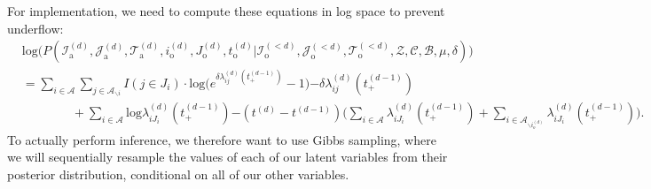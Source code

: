 \documentclass[a4paper]{article}
\begin{document}
For implementation, we need to compute these equations in log space to prevent underflow:
 \begin{equation}
 \begin{aligned}
 &\mbox{log}\Big(P(\mathcal{I}^{(d)}_{\mbox{a}}, \mathcal{J}^{(d)}_{\mbox{a}}, \mathcal{T}^{(d)}_{\mbox{a}}, i^{(d)}_{\mbox{o}}, J^{(d)}_{\mbox{o}}, t^{(d)}_{\mbox{o}} |\mathcal{I}^{(<d)}_{\mbox{o}}, \mathcal{J}^{(<d)}_{\mbox{o}}, \mathcal{T}^{(<d)}_{\mbox{o}}, \mathcal{Z}, \mathcal{C}, \mathcal{B}, \mu, \delta)\Big)\\&=\sum_{i\in \mathcal{A}}\sum_{j \in \mathcal{A}_{\backslash i }} {I(j \in J_i)}\cdot\mbox{log}\Big(e^{\delta\lambda^{(d)}_{ij}(t_+^{(d-1)})}-1\Big) {-\delta\lambda^{(d)}_{ij}(t_+^{(d-1)})}\\&\quad\quad\quad\quad + \sum_{i\in \mathcal{A}} \mbox{log}\lambda^{(d)}_{iJ_i}(t_+^{(d-1)}){-(t^{(d)}-t^{(d-1)})\Big(\sum\limits_{i \in \mathcal{A}}\lambda^{(d)}_{i{J_i}}(t_+^{(d-1)})+\sum\limits_{i \in \mathcal{A}_{\backslash i_o^{(d)}}}\lambda^{(d)}_{i{J_i}}(t_+^{(d-1)})\Big)}.
 \end{aligned}
 \end{equation}
 To actually perform inference, we therefore want to use Gibbs sampling, where we will sequentially resample the values of each of our latent variables from their posterior distribution, conditional on all of our other variables.
\end{document}
